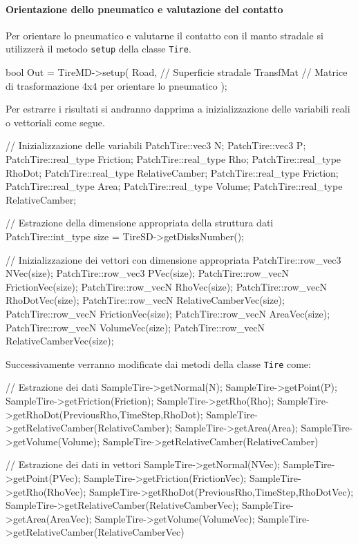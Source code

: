 \paragraph{Orientazione dello pneumatico e valutazione del contatto}
Per orientare lo pneumatico e valutarne il contatto con il manto stradale si utilizzerà il metodo \texttt{setup} della classe \texttt{Tire}.
\begin{pseudoc}
bool Out = TireMD->setup(
	Road,     // Superficie stradale
	TransfMat // Matrice di trasformazione 4x4 per orientare lo pneumatico
	);
\end{pseudoc}
Per estrarre i risultati si andranno dapprima a inizializzazione delle variabili reali o vettoriali come segue.
\begin{pseudoc}
	// Inizializzazione delle variabili
	PatchTire::vec3 N;
	PatchTire::vec3 P;
	PatchTire::real_type Friction;
	PatchTire::real_type Rho;
	PatchTire::real_type RhoDot;
	PatchTire::real_type RelativeCamber;
	PatchTire::real_type Friction;
	PatchTire::real_type Area;
	PatchTire::real_type Volume;
	PatchTire::real_type RelativeCamber;
	
	// Estrazione della dimensione appropriata della struttura dati
	PatchTire::int_type size = TireSD->getDisksNumber();
	
	// Inizializzazione dei vettori con dimensione appropriata
	PatchTire::row_vec3 NVec(size);
	PatchTire::row_vec3 PVec(size);
	PatchTire::row_vecN FrictionVec(size);
	PatchTire::row_vecN RhoVec(size);
	PatchTire::row_vecN RhoDotVec(size);
	PatchTire::row_vecN RelativeCamberVec(size);
	PatchTire::row_vecN FrictionVec(size);
	PatchTire::row_vecN AreaVec(size);
	PatchTire::row_vecN VolumeVec(size);
	PatchTire::row_vecN RelativeCamberVec(size);
\end{pseudoc}
Successivamente verranno modificate dai metodi della classe \texttt{Tire} come:
\begin{pseudoc}
	// Estrazione dei dati
	SampleTire->getNormal(N);
	SampleTire->getPoint(P);
	SampleTire->getFriction(Friction);
	SampleTire->getRho(Rho);
	SampleTire->getRhoDot(PreviousRho,TimeStep,RhoDot);
	SampleTire->getRelativeCamber(RelativeCamber);
	SampleTire->getArea(Area);
	SampleTire->getVolume(Volume);
	SampleTire->getRelativeCamber(RelativeCamber)
	
	// Estrazione dei dati in vettori
	SampleTire->getNormal(NVec);
	SampleTire->getPoint(PVec);
	SampleTire->getFriction(FrictionVec);
	SampleTire->getRho(RhoVec);
	SampleTire->getRhoDot(PreviousRho,TimeStep,RhoDotVec);
	SampleTire->getRelativeCamber(RelativeCamberVec);
	SampleTire->getArea(AreaVec);
	SampleTire->getVolume(VolumeVec);
	SampleTire->getRelativeCamber(RelativeCamberVec)
\end{pseudoc}
%
